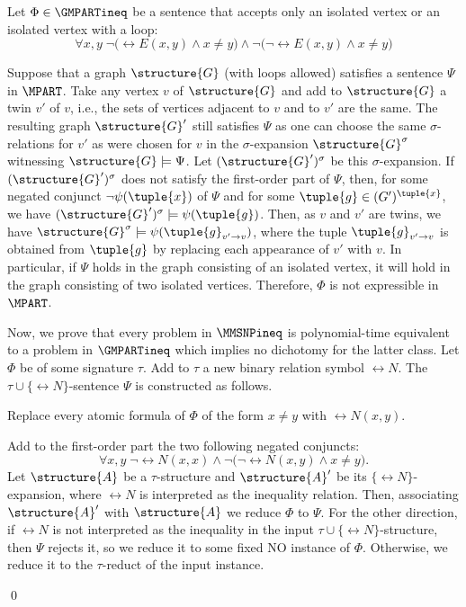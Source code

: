 \documentclass{lmcs}
\begin{document}
Let $\Phi\in\GMPARTineq$ be a sentence that accepts only an isolated vertex or an isolated vertex with a loop:
\begin{equation*}
\forall x,y\; \neg\bigl(\rel{E}(x,y)\wedge x\not=y\bigr) \wedge \neg\bigl(\neg\rel{E}(x,y)\wedge x\not=y\bigr)
\end{equation*}

Suppose that a graph $\structure{G}$ (with loops allowed) satisfies a sentence $\Psi$ in $\MPART$.
%
Take any vertex $v$ of $\structure{G}$ and add to $\structure{G}$ a twin $v'$ of $v$, i.e., the sets of vertices adjacent to $v$ and to $v'$ are the same.
%
The resulting graph $\structure{G}'$ still satisfies $\Psi$ as one can choose the same $\sigma$-relations for $v'$ as were chosen for $v$ in the $\sigma$-expansion $\structure{G}^\sigma$ witnessing $\structure{G}\models\Psi$.
%
Let $(\structure{G}')^\sigma$ be this $\sigma$-expansion.
%
If $(\structure{G}')^\sigma$ does not satisfy the first-order part of $\Psi$, then, for some negated conjunct $\neg\psi(\tuple{x})$ of $\Psi$ and for some $\tuple{g}\in (G')^{\tuple{x}}$, we have $(\structure{G}')^\sigma\models\psi(\tuple{g})$.
%
Then, as $v$ and $v'$ are twins, we have $\structure{G}^\sigma\models\psi(\tuple{g}_{v'\to v})$, where the tuple $\tuple{g}_{v'\to v}$ is obtained from $\tuple{g}$ by replacing each appearance of $v'$ with $v$.
%
In particular, if $\Psi$ holds in the graph consisting of an isolated vertex, it will hold in the graph consisting of two isolated vertices.
%
Therefore, $\Phi$ is not expressible in $\MPART$.

Now, we prove that every problem in $\MMSNPineq$ is polynomial-time equivalent to a problem in $\GMPARTineq$ which implies no dichotomy for the latter class.
%
Let $\Phi$ be of some signature $\tau$. 
%
Add to $\tau$ a new binary relation symbol $\rel{N}$. 
%
The $\tau\cup\{\rel{N}\}$-sentence $\Psi$ is constructed as follows.
\begin{inparaenum}[(a)]
\item Replace every atomic formula of $\Phi$ of the form $x\not=y$ with $\rel{N}(x,y)$.
\item Add to the first-order part the two following negated conjuncts:
\begin{equation*}
\forall x,y\; \neg\rel{N}(x,x)\wedge\neg\bigl(\neg\rel{N}(x,y)\wedge x\not=y\bigr).
\end{equation*}
%
Let $\structure{A}$ be a $\tau$-structure and $\structure{A}'$ be its $\{\rel{N}\}$-expansion, where $\rel{N}$ is interpreted as the inequality relation. 
%
Then, associating $\structure{A}'$ with $\structure{A}$ we reduce $\Phi$ to $\Psi$. 
%
For the other direction, if $\rel{N}$ is not interpreted as the inequality in the input $\tau\cup\{\rel{N}\}$-structure, then $\Psi$ rejects it, so we reduce it to some fixed NO instance of $\Phi$.
%
Otherwise, we reduce it to the $\tau$-reduct of the input instance.
\end{inparaenum}
\qed
\end{document}
